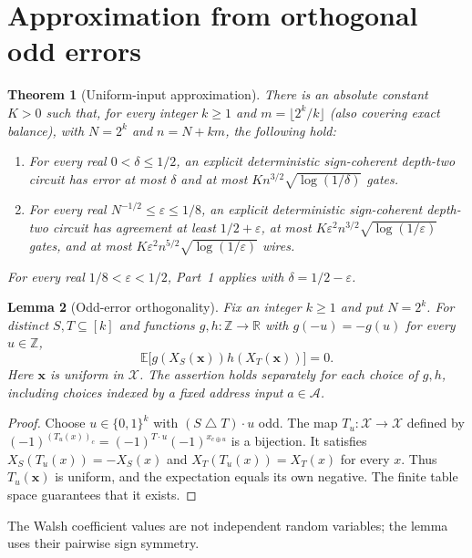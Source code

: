 \documentclass[11pt]{article}
\newtheorem{theorem}{Theorem}[section]
\newtheorem{lemma}[theorem]{Lemma}
\newcommand{\bits}{\{0,1\}}
\begin{document}
\section{Approximation from orthogonal odd errors}\label{sec:approx}
\begin{theorem}[Uniform-input approximation]\label{thm:avgupper}
There is an absolute constant $K>0$ such that, for every integer $k\ge1$
and $m=\lfloor2^k/k\rfloor$ (also covering exact balance), with
$N=2^k$ and $n=N+km$, the following hold:
\begin{enumerate}
\item For every real $0<\delta\le1/2$, an explicit deterministic
 sign-coherent depth-two circuit has error at most $\delta$ and
 at most $K n^{3/2}\sqrt{\log(1/\delta)}$ gates.
\item For every real $N^{-1/2}\le\varepsilon\le1/8$, an explicit
 deterministic sign-coherent depth-two circuit has agreement at least
 $1/2+\varepsilon$, at most
 $K\varepsilon^2n^{3/2}\sqrt{\log(1/\varepsilon)}$ gates, and at most
 $K\varepsilon^2n^{5/2}\sqrt{\log(1/\varepsilon)}$ wires.
\end{enumerate}
For every real $1/8<\varepsilon<1/2$, Part~1 applies with
$\delta=1/2-\varepsilon$.
\end{theorem}

\begin{lemma}[Odd-error orthogonality]\label{lem:odd}
Fix an integer $k\ge1$ and put $N=2^k$. For distinct $S,T\subseteq[k]$
and functions
$g,h:\mathbb Z\to\mathbb R$ with $g(-u)=-g(u)$ for every $u\in\mathbb Z$,
$$\mathbb E\bigl[g(X_S(\boldsymbol{x}))h(X_T(\boldsymbol{x}))\bigr]=0.$$
Here $\boldsymbol{x}$ is uniform in $\mathcal X$.
The assertion holds separately for each choice of $g,h$, including
choices indexed by a fixed address input $a\in\mathcal A$.
\end{lemma}
\begin{proof}
Choose $u\in\bits^k$ with $(S\mathbin\triangle T)\cdot u$ odd.
The map $T_u:\mathcal X\to\mathcal X$ defined by
$(-1)^{(T_u(x))_c}=(-1)^{T\cdot u}(-1)^{x_{c\oplus u}}$
is a bijection. It satisfies
$X_S(T_u(x))=-X_S(x)$ and $X_T(T_u(x))=X_T(x)$ for every $x$.
Thus $T_u(\boldsymbol{x})$ is uniform, and the expectation equals its
own negative. The finite table space guarantees that it exists.
\end{proof}
The Walsh coefficient values are not independent random variables;
the lemma uses their pairwise sign symmetry.
\end{document}
